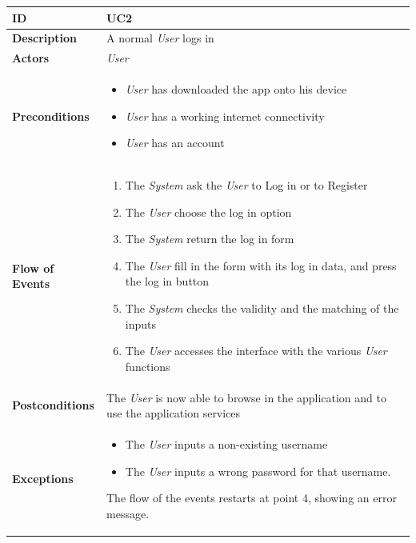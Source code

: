 \begin{table}[ht]
\begin{tabular}{|l|p{}|}
\hline
\textbf{ID}             & UC2                                                                             \\ \hline
\textbf{Description}    & A normal \textit{User} logs in \\ \hline
\textbf{Actors}         &   \textit{User}                                                                            \\ \hline

\textbf{Preconditions}  &   \begin{itemize}

 \item \textit{User} has downloaded the app onto his device
   \item      \textit{User} has a working internet connectivity
     \item       \textit{User} has an account
                 \end{itemize}     
                    \\ \hline
                    
\textbf{Flow of Events} &   \begin{enumerate}
    \item The \textit{System} ask the \textit{User} to Log in or to Register
    \item The \textit{User} choose the log in option
    \item The \textit{System} return the log in form
    \item The \textit{User} fill in the form with its log in data, and press the log in button
    \item The \textit{System} checks the validity and the matching of the inputs
    \item The \textit{User} accesses the interface with the various \textit{User} functions

\end{enumerate}                                                                             \\ \hline
\textbf{Postconditions} &  The \textit{User} is now able  to browse in the application and to use the application services                                                                     \\ \hline

\textbf{Exceptions} &    \begin{itemize}
    \item The \textit{User} inputs a non-existing username
    \item The \textit{User} inputs a wrong password for that username. 

\end{itemize}                                             The flow of the events restarts at point 4, showing an error message.                                \\ \hline

\end{tabular}
\end{table}


